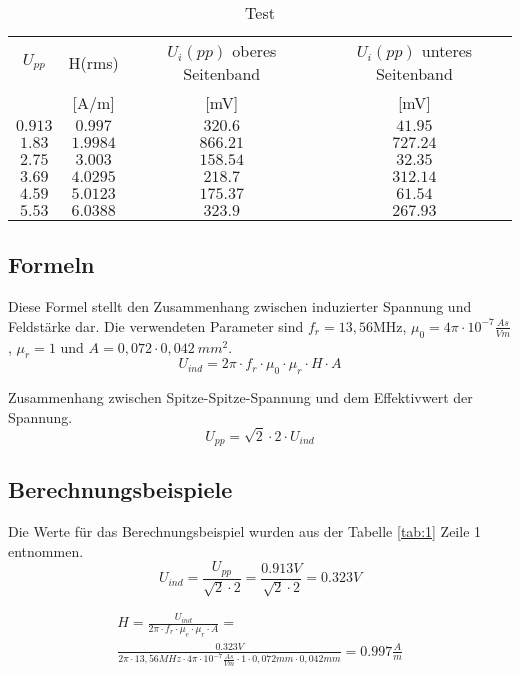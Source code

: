 \documentclass[12pt,a4paper,ngerman]{article}
\begin{document}
\begin{table}
\begin{center}
\begin{tabular}{ |c|c|c|c| }
  \hline
    $U_{pp}$ & H(rms) & $U_i(pp)$ oberes Seitenband & $U_i(pp)$ unteres Seitenband \\
	 [V] & [A/m] & [mV] & [mV] \\
  \hline
  $0.913$ & $0.997$ & $320.6$ & $41.95$\\
  \hline
  $1.83$ & $1.9984$ & $866.21$ & $727.24$ \\
  \hline
  $2.75$ & $3.003$ & $158.54$ & $32.35$\\
  \hline
  $3.69$ & $4.0295$ & $218.7$ & $312.14$\\
    \hline
  $4.59$ & $5.0123$ & $175.37$ & $61.54$\\
    \hline
  $5.53$ & $6.0388$ & $323.9$ & $267.93$ \\
    \hline 
\end{tabular}
\caption{Test}
\end{center}
\end{table} 

\subsection{Formeln}
Diese Formel stellt den Zusammenhang zwischen induzierter Spannung und Feldstärke dar. Die verwendeten Parameter sind $f_r = 13,56$MHz, $\mu_0 = 4\pi \cdot 10^{-7}\frac{As}{Vm}$, $\mu_r = 1$ und $A = 0,072 \cdot 0,042\ mm^2$.
\begin{equation}
U_{ind} = 2\pi \cdot f_r \cdot \mu_0 \cdot \mu_r \cdot H \cdot A
\end{equation}

Zusammenhang zwischen Spitze-Spitze-Spannung und dem Effektivwert der Spannung.
\begin{equation}
U_{pp} = \sqrt{2}  \cdot 2 \cdot U_{ind}
\end{equation}

\subsection{Berechnungsbeispiele}
Die Werte für das Berechnungsbeispiel wurden aus der Tabelle \ref{tab:1} Zeile 1 entnommen.
\begin{equation}
U_{ind} = \frac{U_{pp}}{\sqrt{2}  \cdot 2} = \frac{0.913V}{\sqrt{2}  \cdot 2} = 0.323V
\end{equation}

\begin{gather}
H = \frac{U_{ind}}{2\pi \cdot f_r \cdot \mu_e \cdot \mu_r \cdot A} = \\
\frac{0.323V}{2\pi \cdot 13,56MHz \cdot 4\pi \cdot 10^{-7}\frac{As}{Vm} \cdot 1 \cdot 0,072mm \cdot 0,042mm} = 0.997 \frac{A}{m}
\end{gather}
\end{document}
